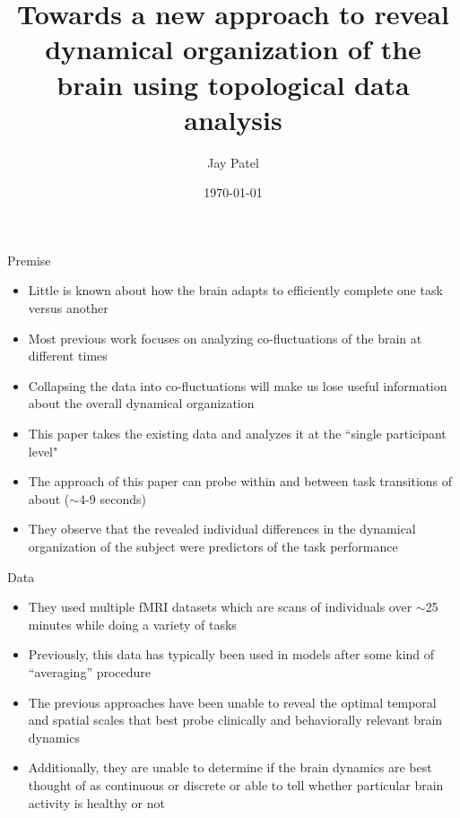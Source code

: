 \documentclass[handout]{beamer}
\title[Dynamical organization of brain using TDA]{Towards a new approach to reveal dynamical
organization of the brain using topological data analysis} %
\author{Jay Patel} %
\institute[OSU] %
{
The Ohio State University \\ %
\medskip
\textit{patel.3316@osu.edu} %
}
\date{\today} %
\begin{document}
\begin{frame}
    \nocite{mainpaper}
    \titlepage %
\end{frame}

\begin{frame}{Premise}
    \begin{itemize}
        \item Little is known about how the brain adapts to efficiently complete one task versus another \pause
        \item Most previous work focuses on analyzing co-fluctuations of the brain at different times\cite{oldDataCollapsed}\pause
        \item Collapsing the data into co-fluctuations will make us lose useful information about the overall dynamical organization \pause
        \item This paper takes the existing data and analyzes it at the ``single participant level" \pause
        \item The approach of this paper can probe within and between task transitions of about ($\sim$4-9 seconds) \pause
        \item They observe that the revealed individual differences in the dynamical organization of the subject were predictors of the task performance
    \end{itemize}
\end{frame}

\begin{frame}{Data}
    \begin{itemize}
        \item They used multiple fMRI datasets which are scans of individuals over $\sim$25  minutes while doing a variety of tasks \pause
        \item Previously, this data has typically been used in models after some kind of ``averaging'' procedure \pause
        \item The previous approaches have been unable to reveal the optimal temporal and spatial scales that best probe clinically and behaviorally relevant brain dynamics \pause
        \item Additionally, they are unable to determine if the brain dynamics are best thought of as continuous or discrete or able to tell whether particular brain activity is healthy or not
    \end{itemize}
\end{frame}
\end{document}
